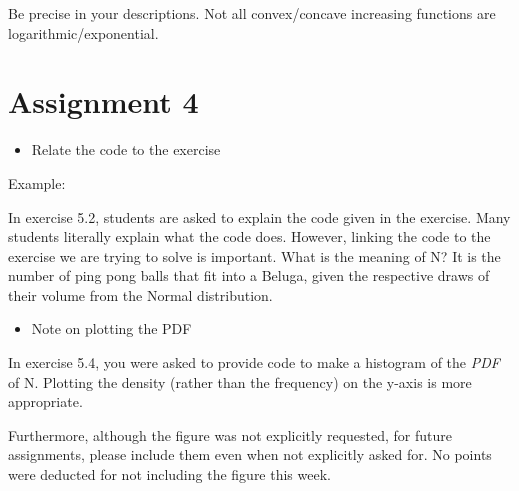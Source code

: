 Be precise in your descriptions. Not all convex/concave increasing
functions are logarithmic/exponential.

\section*{Assignment 4}

\begin{itemize}
\item Relate the code to the exercise
\end{itemize}

Example:

In exercise 5.2, students are asked to explain the code given in the
exercise. Many students literally explain what the code does. However,
linking the code to the exercise we are trying to solve is important.
What is the meaning of N? It is the number of ping pong balls that fit
into a Beluga, given the respective draws of their volume from the
Normal distribution.

\begin{itemize}
\item Note on plotting the PDF 
\end{itemize}

In exercise 5.4, you were asked to provide code to make a histogram of
the \emph{PDF} of N. Plotting the density (rather than the frequency)
on the y-axis is more appropriate.

Furthermore, although the figure was not explicitly requested, for
future assignments, please include them even when not explicitly asked
for. No points were deducted for not including the figure this week.


